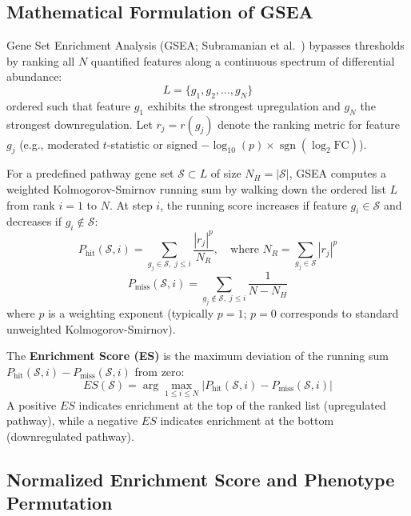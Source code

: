 \documentclass[11pt,twoside,openright]{book}
\begin{document}
\subsection{Mathematical Formulation of GSEA}

Gene Set Enrichment Analysis (GSEA; Subramanian et al.~\cite{subramanian2005gene}) bypasses thresholds by ranking all $N$ quantified features along a continuous spectrum of differential abundance:
\begin{equation}
L = \{g_1, g_2, \dots, g_N\}
\end{equation}
ordered such that feature $g_1$ exhibits the strongest upregulation and $g_N$ the strongest downregulation. Let $r_j = r(g_j)$ denote the ranking metric for feature $g_j$ (e.g., moderated $t$-statistic or signed $-\log_{10}(p) \times \operatorname{sgn}(\log_2 \text{FC})$).

For a predefined pathway gene set $\mathcal{S} \subset L$ of size $N_H = |\mathcal{S}|$, GSEA computes a weighted Kolmogorov-Smirnov running sum by walking down the ordered list $L$ from rank $i = 1$ to $N$. At step $i$, the running score increases if feature $g_i \in \mathcal{S}$ and decreases if $g_i \notin \mathcal{S}$:
\begin{equation}
\label{eq:gsea_phit}
P_{\text{hit}}(\mathcal{S}, i) = \sum_{g_j \in \mathcal{S}, \; j \le i} \frac{|r_j|^p}{N_R}, \quad \text{where } N_R = \sum_{g_j \in \mathcal{S}} |r_j|^p
\end{equation}
\begin{equation}
\label{eq:gsea_pmiss}
P_{\text{miss}}(\mathcal{S}, i) = \sum_{g_j \notin \mathcal{S}, \; j \le i} \frac{1}{N - N_H}
\end{equation}
where $p$ is a weighting exponent (typically $p = 1$; $p = 0$ corresponds to standard unweighted Kolmogorov-Smirnov).

The \textbf{Enrichment Score (ES)} is the maximum deviation of the running sum $P_{\text{hit}}(\mathcal{S}, i) - P_{\text{miss}}(\mathcal{S}, i)$ from zero:
\begin{equation}
\label{eq:gsea_es}
ES(\mathcal{S}) = \arg \max_{1 \le i \le N} \left| P_{\text{hit}}(\mathcal{S}, i) - P_{\text{miss}}(\mathcal{S}, i) \right|
\end{equation}
A positive $ES$ indicates enrichment at the top of the ranked list (upregulated pathway), while a negative $ES$ indicates enrichment at the bottom (downregulated pathway).

\subsection{Normalized Enrichment Score and Phenotype Permutation}
\end{document}
